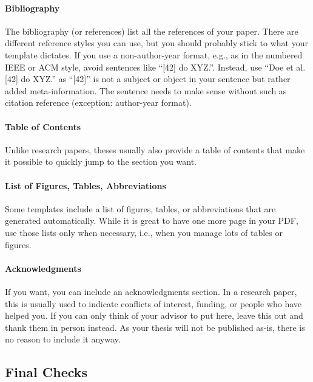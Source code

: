 \documentclass[a4paper]{article}
\begin{document}
\paragraph{Bibliography}

The bibliography (or references) list all the references of your paper.
There are different reference styles you can use, but you should probably stick to what your template dictates.
If you use a non-author-year format, e.g., as in the numbered IEEE or ACM style, avoid sentences like ``[42] do XYZ.''.
Instead, use ``Doe et al. [42] do XYZ.'' as ``[42]'' is not a subject or object in your sentence but rather added meta-information.
The sentence needs to make sense without such as citation reference (exception: author-year format).

\paragraph{Table of Contents}

Unlike research papers, theses usually also provide a table of contents that make it possible to quickly jump to the section you want.

\paragraph{List of Figures, Tables, Abbreviations}

Some templates include a list of figures, tables, or abbreviations that are generated automatically.
While it is great to have one more page in your PDF, use those lists only when necessary, i.e., when you manage lots of tables or figures.

\paragraph{Acknowledgments}

If you want, you can include an acknowledgments section.
In a research paper, this is usually used to indicate conflicts of interest, funding, or people who have helped you.
If you can only think of your advisor to put here, leave this out and thank them in person instead.
As your thesis will not be published as-is, there is no reason to include it anyway.

\subsection{Final Checks}
\end{document}
